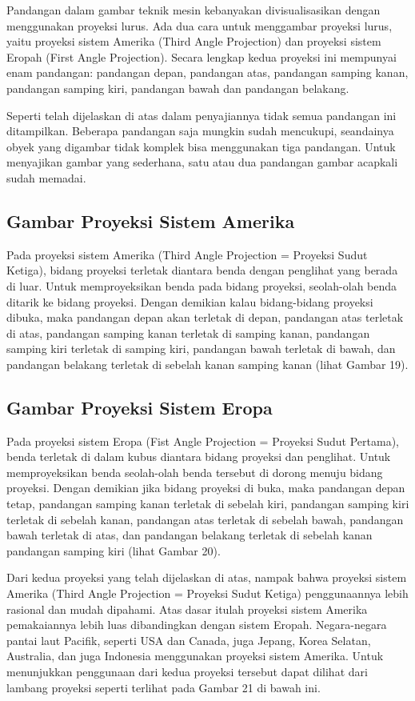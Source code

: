 \documentclass[11pt]{simart} %
\begin{document}
Pandangan dalam gambar teknik mesin kebanyakan divisualisasikan dengan menggunakan proyeksi lurus. Ada dua cara untuk menggambar proyeksi lurus, yaitu proyeksi sistem Amerika (Third Angle Projection) dan proyeksi sistem Eropah (First Angle Projection). Secara lengkap kedua proyeksi ini mempunyai enam pandangan: pandangan depan, pandangan atas, pandangan samping kanan, pandangan samping kiri, pandangan bawah dan pandangan belakang.

Seperti telah dijelaskan di atas dalam penyajiannya tidak semua pandangan ini ditampilkan. Beberapa pandangan saja mungkin sudah mencukupi, seandainya obyek yang digambar tidak komplek bisa menggunakan tiga pandangan. Untuk menyajikan gambar yang sederhana, satu atau dua pandangan gambar acapkali sudah memadai.

\subsection{Gambar Proyeksi Sistem Amerika}
Pada proyeksi sistem Amerika (Third Angle Projection = Proyeksi Sudut Ketiga), bidang proyeksi terletak diantara benda dengan penglihat yang berada di luar. Untuk memproyeksikan benda pada bidang proyeksi, seolah-olah benda ditarik ke bidang proyeksi. Dengan demikian kalau bidang-bidang proyeksi dibuka, maka pandangan depan akan terletak di depan, pandangan atas terletak di atas, pandangan samping kanan terletak di samping kanan, pandangan samping kiri terletak di samping kiri, pandangan bawah terletak di bawah, dan pandangan belakang terletak di sebelah kanan samping kanan (lihat Gambar 19).

\subsection{Gambar Proyeksi Sistem Eropa}
Pada proyeksi sistem Eropa (Fist Angle Projection = Proyeksi Sudut Pertama), benda terletak di dalam kubus diantara bidang proyeksi dan penglihat. Untuk memproyeksikan benda seolah-olah benda tersebut di dorong menuju bidang proyeksi. Dengan demikian jika bidang proyeksi di buka, maka pandangan depan tetap, pandangan samping kanan terletak di sebelah kiri, pandangan samping kiri terletak di sebelah kanan, pandangan atas terletak di sebelah bawah, pandangan bawah terletak di atas, dan pandangan belakang terletak di sebelah kanan pandangan samping kiri (lihat Gambar 20).

Dari kedua proyeksi yang telah dijelaskan di atas, nampak bahwa proyeksi sistem Amerika (Third Angle Projection = Proyeksi Sudut Ketiga) penggunaannya lebih rasional dan mudah dipahami. Atas dasar itulah proyeksi sistem Amerika pemakaiannya lebih luas dibandingkan dengan sistem Eropah. Negara-negara pantai laut Pacifik, seperti USA dan Canada, juga Jepang, Korea Selatan, Australia, dan juga Indonesia menggunakan proyeksi sistem Amerika. Untuk menunjukkan penggunaan dari kedua proyeksi tersebut dapat dilihat dari lambang proyeksi seperti terlihat pada Gambar 21 di bawah ini.
\end{document}
